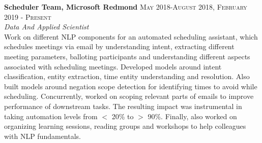 \headedsection
{\bf Scheduler Team, Microsoft Redmond}
{\textsc{May 2018-August 2018, February 2019 - Present}} {%
    {\\
    \emph{Data And Applied Scientist} \\
    Work on different NLP components for an automated scheduling assistant, which schedules meetings via email by understanding intent, extracting different meeting parameters, balloting participants and understanding different aspects associated with scheduling meetings. Developed models around intent classification, entity extraction, time entity understanding and resolution. Also built models around negation scope detection for identifying times to avoid while scheduling. Concurrently, worked on scoping relevant parts of emails to improve performance of downstream tasks. The resulting impact was instrumental in taking automation levels from $<$ 20\% to $>$ 90\%. Finally, also worked on organizing learning sessions, reading groups and workshops to help colleagues with NLP fundamentals.
    }
}